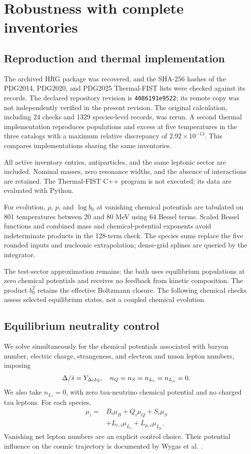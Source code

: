 \documentclass[10pt,a4paper,twocolumn]{article}
\newcommand{\Y}{{Y_\Delta}}
\newcommand{\sbar}{\bar s}
\begin{document}
\section{Robustness with complete inventories}
\subsection{Reproduction and thermal implementation}
The archived HRG package was recovered, and the SHA-256 hashes of the PDG2014, PDG2020, and PDG2025 Thermal-FIST lists \cite{fist} were checked against its records. The declared repository revision is \texttt{4086191e9522}; its remote copy was not independently verified in the present revision. The original calculation, including 24 checks and 1329 species-level records, was rerun. A second thermal implementation reproduces populations and excess at five temperatures in the three catalogs with a maximum relative discrepancy of $2.92\times10^{-13}$. This compares implementations sharing the same inventories.

All active inventory entries, antiparticles, and the same leptonic sector are included. Nominal masses, zero resonance widths, and the absence of interactions are retained. The Thermal-FIST C++ program is not executed; its data are evaluated with Python.

For evolution, $\rho$, $p$, and $\log b_0$ at vanishing chemical potentials are tabulated on 801 temperatures between 20 and 80 MeV using 64 Bessel terms. Scaled Bessel functions and combined mass and chemical-potential exponents avoid indeterminate products in the 128-term check. The species sums replace the five rounded inputs and nucleonic extrapolation; dense-grid splines are queried by the integrator.

The test-sector approximation remains: the bath uses equilibrium populations at zero chemical potentials and receives no feedback from kinetic composition. The product $b_0^2$ retains the effective Boltzmann closure. The following chemical checks assess selected equilibrium states, not a coupled chemical evolution.

\subsection{Equilibrium neutrality control}
We solve simultaneously for the chemical potentials associated with baryon number, electric charge, strangeness, and electron and muon lepton numbers, imposing
\begin{equation}
\Delta/\sbar=\Y_{\rm obj},\quad n_Q=n_S=n_{L_e}=n_{L_\mu}=0.
\end{equation}
We also take $n_{L_\tau}=0$, with zero tau-neutrino chemical potential and no charged tau leptons. For each species,
\begin{align}
\mu_i={}&B_i\mu_B+Q_i\mu_Q+S_i\mu_S\nonumber\\
&+L_{e,i}\mu_{L_e}+L_{\mu,i}\mu_{L_\mu}.
\end{align}
Vanishing net lepton numbers are an explicit control choice. Their potential influence on the cosmic trajectory is documented by Wygas et al. \cite{wygas}.
\end{document}
